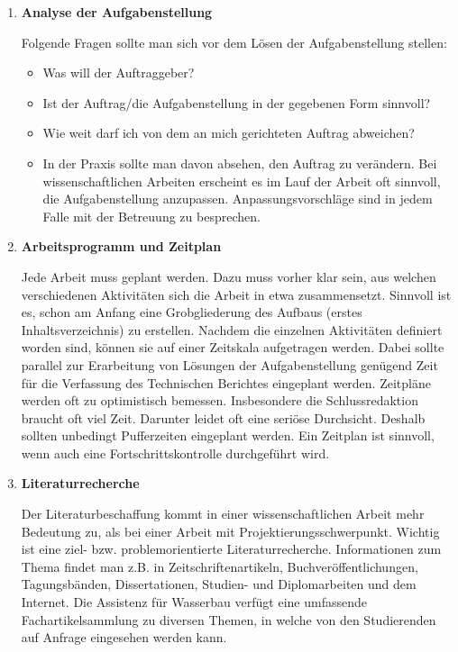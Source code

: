 \documentclass[
  letterpaper,
  DIV=11]{scrartcl}
\begin{document}
\begin{enumerate}
\def\labelenumi{\arabic{enumi}.}
\item
  \textbf{Analyse der Aufgabenstellung}

  Folgende Fragen sollte man sich vor dem Lösen der Aufgabenstellung
  stellen:

  \begin{itemize}
  \item
    Was will der Auftraggeber?
  \item
    Ist der Auftrag/die Aufgabenstellung in der gegebenen Form sinnvoll?
  \item
    Wie weit darf ich von dem an mich gerichteten Auftrag abweichen?
  \item
    In der Praxis sollte man davon absehen, den Auftrag zu verändern.
    Bei wissenschaftlichen Arbeiten erscheint es im Lauf der Arbeit oft
    sinnvoll, die Aufgabenstellung anzupassen. Anpassungsvorschläge sind
    in jedem Falle mit der Betreuung zu besprechen.
  \end{itemize}
\item
  \textbf{Arbeitsprogramm und Zeitplan}

  Jede Arbeit muss geplant werden. Dazu muss vorher klar sein, aus
  welchen verschiedenen Aktivitäten sich die Arbeit in etwa
  zusammensetzt. Sinnvoll ist es, schon am Anfang eine Grobgliederung
  des Aufbaus (erstes Inhaltsverzeichnis) zu erstellen. Nachdem die
  einzelnen Aktivitäten definiert worden sind, können sie auf einer
  Zeitskala aufgetragen werden. Dabei sollte parallel zur Erarbeitung
  von Lösungen der Aufgabenstellung genügend Zeit für die Verfassung des
  Technischen Berichtes eingeplant werden. Zeitpläne werden oft zu
  optimistisch bemessen. Insbesondere die Schlussredaktion braucht oft
  viel Zeit. Darunter leidet oft eine seriöse Durchsicht. Deshalb
  sollten unbedingt Pufferzeiten eingeplant werden. Ein Zeitplan ist
  sinnvoll, wenn auch eine Fortschrittskontrolle durchgeführt wird.
\item
  \textbf{Literaturrecherche}

  Der Literaturbeschaffung kommt in einer wissenschaftlichen Arbeit mehr
  Bedeutung zu, als bei einer Arbeit mit Projektierungsschwerpunkt.
  Wichtig ist eine ziel- bzw. problemorientierte Literaturrecherche.
  Informationen zum Thema findet man z.B. in Zeitschriftenartikeln,
  Buchveröffentlichungen, Tagungsbänden, Dissertationen, Studien- und
  Diplomarbeiten und dem Internet. Die Assistenz für Wasserbau verfügt
  eine umfassende Fachartikelsammlung zu diversen Themen, in welche von
  den Studierenden auf Anfrage eingesehen werden kann.
\end{enumerate}
\end{document}
